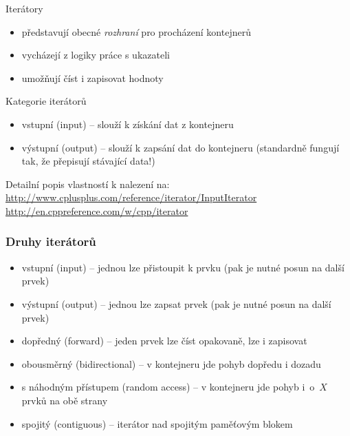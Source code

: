


\begin{frame}[fragile]
\begin{block}{Iterátory}
\begin{itemize}
\item představují obecné \textit{rozhraní} pro procházení kontejnerů
\item vycházejí z logiky práce s ukazateli
\item umožňují číst i zapisovat hodnoty
\end{itemize}

\end{block}

\begin{block}{Kategorie iterátorů}
\begin{itemize}
\item vstupní (input) -- slouží k získání dat z kontejneru
\item výstupní (output) -- slouží k zapsání dat do kontejneru (standardně fungují tak, že přepisují stávající data!)
\end{itemize}

Detailní popis vlastností k nalezení na: 
\url{http://www.cplusplus.com/reference/iterator/InputIterator}
\url{http://en.cppreference.com/w/cpp/iterator}
\end{block}
\end{frame}


\begin{frame}[fragile]
\frametitle{Druhy iterátorů}
\begin{block}{}
\begin{itemize}
\item vstupní (input) -- jednou lze přistoupit k prvku (pak je nutné posun na další prvek)
\item výstupní (output) -- jednou lze zapsat prvek (pak je nutné posun na další prvek)
\item dopředný (forward) -- jeden prvek lze číst opakovaně, lze i zapisovat
\item obousměrný (bidirectional) -- v kontejneru jde pohyb dopředu i dozadu
\item s náhodným přístupem (random access) -- v kontejneru jde pohyb i~o~$X$ prvků na obě strany
\item spojitý (contiguous) -- iterátor nad spojitým paměťovým blokem
\end{itemize}
\end{block}
\end{frame}



